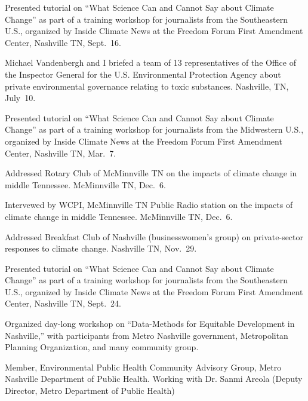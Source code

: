 \item[2019] Presented tutorial on ``What Science Can and Cannot Say about Climate Change'' as part of a training workshop for journalists from the Southeastern U.S., organized by Inside Climate News at the Freedom Forum First Amendment Center, Nashville TN, Sept.~16.
\item[2019] Michael Vandenbergh and I briefed a team of 13 representatives of the Office of the Inspector General for the U.S. Environmental Protection Agency about private environmental governance relating to toxic substances. Nashville, TN, July~10.
\item[2019] Presented tutorial on ``What Science Can and Cannot Say about Climate Change'' as part of a training workshop for journalists from the Midwestern U.S., organized by Inside Climate News at the Freedom Forum First Amendment Center, Nashville TN, Mar.~7.
\item[2018] Addressed Rotary Club of McMinnville TN on the impacts of climate change in middle Tennessee. McMinnville TN, Dec.\ 6.
\item[2018] Intervewed by WCPI, McMinnville TN Public Radio station on the impacts of climate change in middle Tennessee. McMinnville TN, Dec.\ 6.
\item[2018] Addressed Breakfast Club of Nashville (businesswomen's group) on private-sector responses to climate change. Nashville TN, Nov.\ 29.
\item[2018] Presented tutorial on ``What Science Can and Cannot Say about Climate Change'' as part of a training workshop for journalists from the Southeastern U.S., organized by Inside Climate News at the Freedom Forum First Amendment Center, Nashville TN, Sept.~24.
\item[2018] Organized day-long workshop on ``Data-Methods for Equitable Development in Nashville,'' with participants from Metro Nashville government, Metropolitan Planning Organization,
            and many community group.
\item[2017--present] Member, Environmental Public Health Community Advisory Group, Metro Nashville Department of Public Health. Working with Dr. Sanmi Areola (Deputy Director, Metro Department of Public Health)
